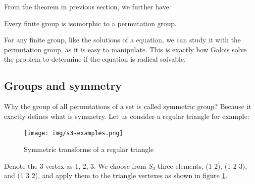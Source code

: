\documentclass[b5paper]{article}
\begin{document}
From the theorem in previous section, we further have:

\begin{theorem}
Every finite group is isomorphic to a permutation group.
\end{theorem}

For any finite group, like the solutions of a equation, we can study it with the permutation group, as it is easy to manipulate. This is exactly how Galois solve the problem to determine if the equation is radical solvable.

\begin{Exercise}
\end{Exercise}

\subsection{Groups and symmetry}

Why the group of all permutations of a set is called symmetric group? Because it exactly defines what is symmetry. Let us consider a regular triangle for example:

\begin{figure}[htbp]
 \centering
 \texttt{[image: img/s3-examples.png]}
 \caption{Symmetric transforms of a regular triangle}
 \label{fig:S3-examples}
\end{figure}

Denote the 3 vertex as 1, 2, 3. We choose from $S_3$ three elements, (1 2), (1 2 3), and (1 3 2), and apply them to the triangle vertexes as shown in figure \ref{fig:S3-examples}.
\end{document}
